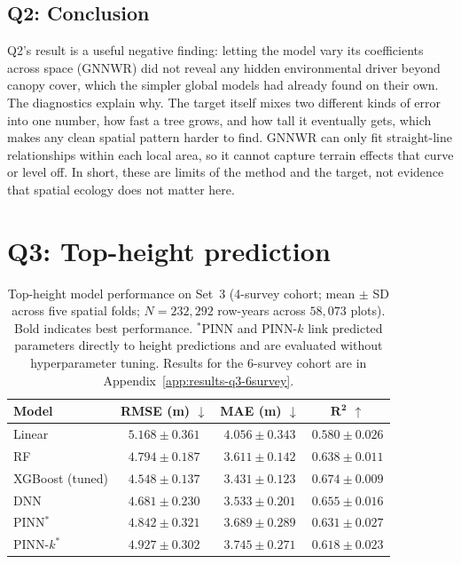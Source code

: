 \documentclass[logo,msc,ai]{infthesis}           %
\begin{document}
\subsection*{Q2: Conclusion}
Q2's result is a useful negative finding: letting the model vary its coefficients across space (GNNWR) did not reveal any hidden environmental driver beyond canopy cover, which the simpler global models had already found on their own. The diagnostics explain why. The target itself mixes two different kinds of error into one number, how fast a tree grows, and how tall it eventually gets, which makes any clean spatial pattern harder to find. GNNWR can only fit straight-line relationships within each local area, so it cannot capture terrain effects that curve or level off. In short, these are limits of the method and the target, not evidence that spatial ecology does not matter here.

\section{Q3: Top-height prediction}

\begin{table}[H]
\centering
\scriptsize
\renewcommand{\arraystretch}{0.9}
\setlength{\tabcolsep}{12pt}
\begin{tabular}{l ccc}
\toprule
\textbf{Model} & \textbf{RMSE (m)} $\downarrow$ & \textbf{MAE (m)} $\downarrow$ & $\mathbf{R^2}$ $\uparrow$ \\
\midrule
Linear          & $5.168 \pm 0.361$ & $4.056 \pm 0.343$ & $0.580 \pm 0.026$ \\
RF              & $4.794 \pm 0.187$ & $3.611 \pm 0.142$ & $0.638 \pm 0.011$ \\
XGBoost (tuned) & $\mathbf{4.548 \pm 0.137}$ & $\mathbf{3.431 \pm 0.123}$ & $\mathbf{0.674 \pm 0.009}$ \\
DNN             & $4.681 \pm 0.230$ & $3.533 \pm 0.201$ & $0.655 \pm 0.016$ \\
PINN$^*$        & $4.842 \pm 0.321$ & $3.689 \pm 0.289$ & $0.631 \pm 0.027$ \\
PINN-$k^*$      & $4.927 \pm 0.302$ & $3.745 \pm 0.271$ & $0.618 \pm 0.023$ \\
\bottomrule
\end{tabular}
\caption{\footnotesize{Top-height model performance on Set~3 (4-survey cohort; mean $\pm$ SD across five spatial folds; $N=232{,}292$ row-years across $58{,}073$ plots). Bold indicates best performance. $^*$PINN and PINN-$k$ link predicted parameters directly to height predictions and are evaluated without hyperparameter tuning. Results for the 6-survey cohort are in Appendix~\ref{app:results-q3-6survey}.}}
\label{tab:results-q3}
\end{table}
\end{document}
